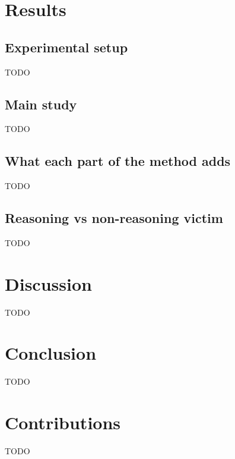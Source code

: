 \documentclass[sigconf,nonacm]{acmart}
\begin{document}
\section{Results}
\subsection{Experimental setup}
TODO

\subsection{Main study}
TODO

\subsection{What each part of the method adds}
TODO

\subsection{Reasoning vs non-reasoning victim}
TODO

\section{Discussion}
TODO

\section{Conclusion}
TODO

\section{Contributions}
TODO



\end{document}
